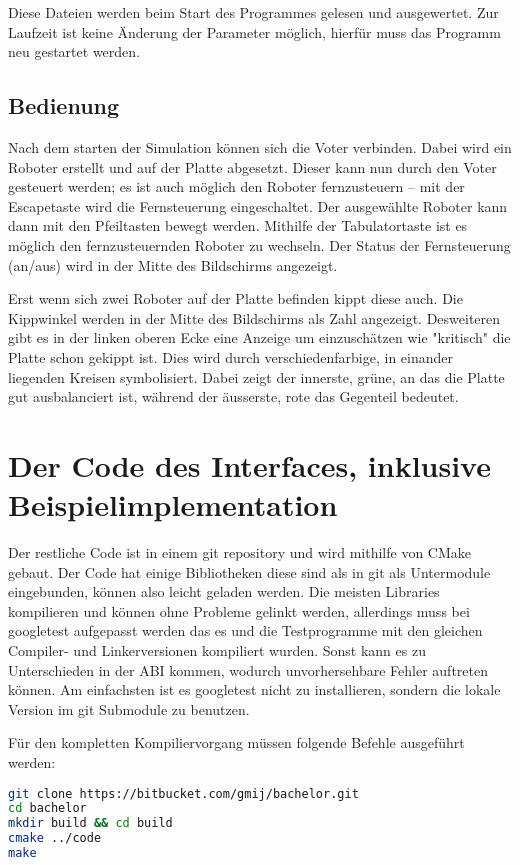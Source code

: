 \documentclass[
    12pt,
    bibliography=totoc,
    ngerman,
    enabledeprecatedfontcommands
]{scrartcl}
\begin{document}
Diese Dateien werden beim Start des Programmes gelesen und ausgewertet. Zur Laufzeit ist keine {\"{A}}nderung der Parameter m{\"{o}}glich, hierf{\"{u}}r muss das Programm
neu gestartet werden.

\subsection{Bedienung}
Nach dem starten der Simulation k{\"{o}}nnen sich die Voter verbinden. Dabei wird ein Roboter erstellt und auf der Platte abgesetzt. Dieser kann nun durch den Voter
gesteuert werden; es ist auch m{\"{o}}glich den Roboter fernzusteuern -- mit der Escapetaste wird die Fernsteuerung eingeschaltet. Der ausgew{\"{a}}hlte Roboter kann
dann mit den Pfeiltasten bewegt werden. Mithilfe der Tabulatortaste ist es m{\"{o}}glich den fernzusteuernden Roboter zu wechseln. Der Status der Fernsteuerung (an/aus)
wird in der Mitte des Bildschirms angezeigt.

Erst wenn sich zwei Roboter auf der Platte befinden kippt diese auch. Die Kippwinkel werden in der Mitte des Bildschirms als Zahl angezeigt. Desweiteren gibt es in der
linken oberen Ecke eine Anzeige um einzusch{\"{a}}tzen wie "kritisch" die Platte schon gekippt ist. Dies wird durch verschiedenfarbige, in einander liegenden Kreisen
symbolisiert. Dabei zeigt der innerste, gr{\"{u}}ne, an das die Platte gut ausbalanciert ist, w{\"{a}}hrend der {\"{a}}usserste, rote das Gegenteil bedeutet.


\section{Der Code des Interfaces, inklusive Beispielimplementation}
Der restliche Code ist in einem git repository und wird mithilfe von CMake gebaut. Der Code hat einige Bibliotheken
diese sind als in git als Untermodule eingebunden, k{\"{o}}nnen also leicht geladen werden.
Die meisten Libraries kompilieren und k{\"{o}}nnen ohne Probleme gelinkt werden, allerdings muss bei googletest aufgepasst werden das es und die Testprogramme mit den
gleichen Compiler- und Linkerversionen kompiliert wurden. Sonst kann es zu Unterschieden in der ABI kommen, wodurch unvorhersehbare Fehler auftreten k{\"{o}}nnen. Am einfachsten
ist es googletest nicht zu installieren, sondern die lokale Version im git Submodule zu benutzen.

F{\"{u}}r den kompletten Kompiliervorgang m{\"{u}}ssen folgende Befehle ausgef{\"{u}}hrt werden:
\begin{lstlisting}[frame=single, language=Bash] 
git clone https://bitbucket.com/gmij/bachelor.git
cd bachelor
mkdir build && cd build
cmake ../code
make
\end{lstlisting}
\end{document}
